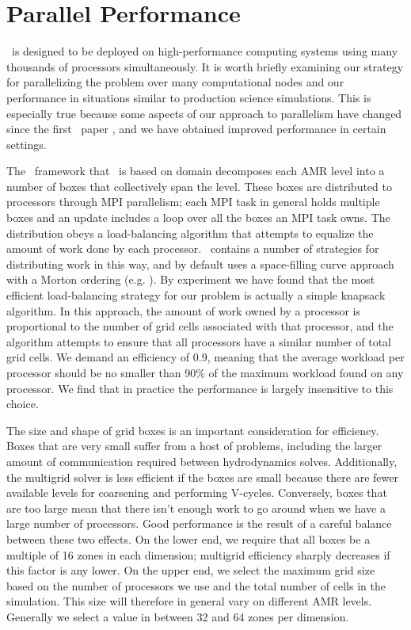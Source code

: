 \documentclass[12pt]{article}
\begin{document}
\clearpage
\section{Parallel Performance}
\label{sec:performance}

\castro\ is designed to be deployed on high-performance computing systems using 
many thousands of processors simultaneously. It is worth briefly examining 
our strategy for parallelizing the problem over many computational nodes 
and our performance in situations similar to production science simulations. 
This is especially true because some aspects of our approach to parallelism 
have changed since the first \castro\ paper \citep{castro}, and we have obtained improved 
performance in certain settings.

The \boxlib\ framework that \castro\ is based on domain decomposes each AMR level into a number 
of boxes that collectively span the level. These boxes are distributed to processors 
through MPI parallelism; each MPI task in general holds multiple boxes and 
an update includes a loop over all the boxes an MPI task owns. The distribution 
obeys a load-balancing algorithm that attempts to equalize the amount of work 
done by each processor. \boxlib\ contains a number of strategies for distributing 
work in this way, and by default uses a space-filling curve approach with a 
Morton ordering (e.g. \cite{sasidharan:2015,beichl:1998}). By experiment we have found that the most efficient load-balancing 
strategy for our problem is actually a simple knapsack algorithm. In this approach, 
the amount of work owned by a processor is proportional to the number of grid cells 
associated with that processor, and the algorithm attempts to ensure that all 
processors have a similar number of total grid cells. We demand an efficiency of 0.9,
meaning that the average workload per processor should be no smaller than 90\% of the 
maximum workload found on any processor. We find that in practice the 
performance is largely insensitive to this choice.

The size and shape of grid boxes is an important consideration for efficiency. 
Boxes that are very small suffer from a host of problems, including the larger 
amount of communication required between hydrodynamics solves. Additionally, 
the multigrid solver is less efficient if the boxes are small because there 
are fewer available levels for coarsening and performing V-cycles. Conversely, 
boxes that are too large mean that there isn't enough work to go around when we 
have a large number of processors. Good performance is the result of a careful 
balance between these two effects. On the lower end, we require that all boxes 
be a multiple of 16 zones in each dimension; multigrid efficiency sharply decreases 
if this factor is any lower. On the upper end, we select the maximum grid size 
based on the number of processors we use and the total number of cells in the 
simulation. This size will therefore in general vary on different AMR levels. 
Generally we select a value in between 32 and 64 zones per dimension.
\end{document}
